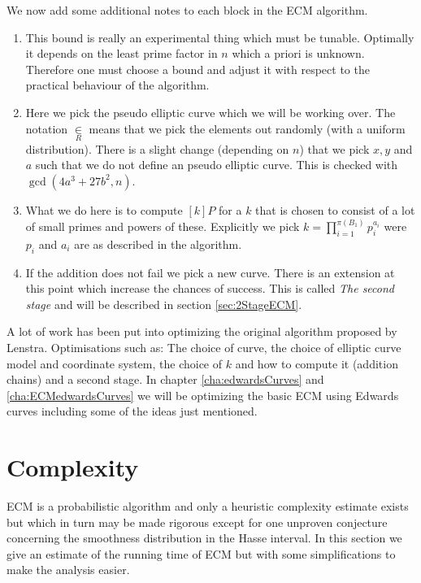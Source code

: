 We now add some additional notes to each block in the ECM algorithm. 
\begin{enumerate}[(1)]
\item This bound is really an experimental thing which must be tunable. Optimally it depends on the least prime factor in $n$ which a priori is unknown. Therefore one must choose a bound and adjust it with respect to the practical behaviour of the algorithm. 
\item Here we pick the pseudo elliptic curve which we will be working over. The notation $\underset{R}{\in}$ means that we pick the elements out randomly (with a uniform distribution). There is a slight change (depending on $n$) that we pick $x,y$ and $a$ such that we do not define an pseudo elliptic curve. This is checked with $\gcd(4a^3+27b^2,n)$. 
\item What we do here is to compute $[k]P$ for a $k$ that is chosen to consist of a lot of small primes and powers of these. Explicitly we pick $k=\prod_{i=1}^{\pi(B_1)} p_i^{a_i}$ were $p_i$ and $a_i$ are as described in the algorithm. 
\item If the addition does not fail we pick a new curve. There is an extension at this point which increase the chances of success. This is called \textit{The second stage} and will be described in section \ref{sec:2StageECM}.
\end{enumerate}
A lot of work has been put into optimizing the original algorithm proposed by Lenstra. Optimisations such as: The choice of curve, the choice of elliptic curve model and coordinate system, the choice of $k$ and how to compute it (addition chains) and a second stage. In chapter \ref{cha:edwardsCurves} and \ref{cha:ECMedwardsCurves} we will be optimizing the basic ECM using Edwards curves including some of the ideas just mentioned. 
 
\section{Complexity}
\label{sec:ECMcomplextiy}
ECM is a probabilistic algorithm and only a heuristic complexity estimate exists but which in turn may be made rigorous except for one unproven conjecture concerning the smoothness distribution in the Hasse interval. In this section we give an estimate of the running time of ECM but with some simplifications to make the analysis easier.

